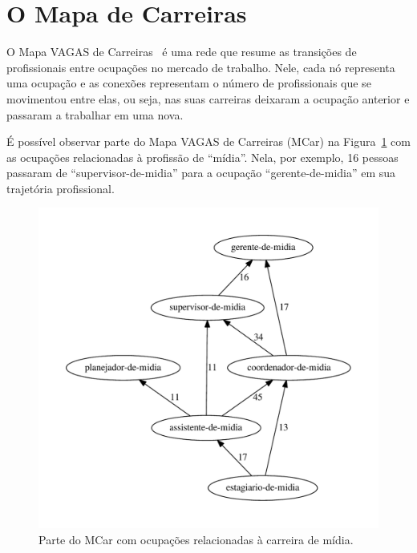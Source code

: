 \documentclass[
  article,
  11pt,
  a4paper,
  english,
  brazil,
  sumario=tradicional]{abntex2}
\begin{document}

\section{O Mapa de Carreiras} \label{sec:mapa}

O Mapa VAGAS de Carreiras~\cite{VAGAS_Tecnologia2015-yv} é uma rede que resume as transições de profissionais entre ocupações no mercado de trabalho. Nele, cada nó representa uma ocupação e as conexões representam o número de profissionais que se movimentou entre elas, ou seja, nas suas carreiras deixaram a ocupação anterior e passaram a trabalhar em uma nova.

É possível observar parte do Mapa VAGAS de Carreiras (MCar) na Figura~\ref{fig:ex-mapa-midia} com as ocupações relacionadas à profissão de \enquote{mídia}. Nela, por exemplo, 16 pessoas passaram de \enquote{supervisor-de-midia} para a ocupação \enquote{gerente-de-midia} em sua trajetória profissional.

\begin{figure}[ht]
  \centering
  \includegraphics[scale=0.6]{cluster_23.pdf}
  \caption{Parte do MCar com ocupações relacionadas à carreira de mídia.}
  \label{fig:ex-mapa-midia}
\end{figure}
\end{document}
